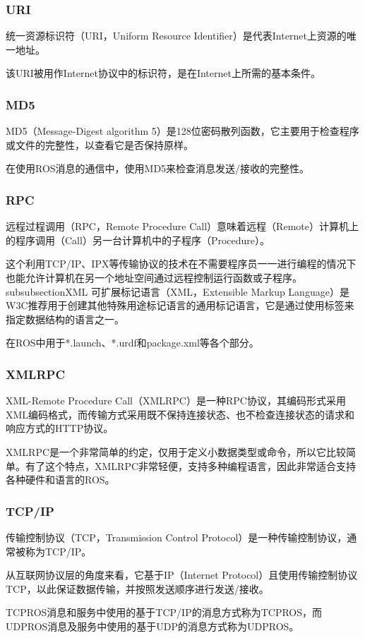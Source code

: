 \documentclass[geye,green,kindle,cn]{elegantnote}
\begin{document}
\subsubsection{URI}
统一资源标识符（URI，Uniform Resource Identifier）是代表Internet上资源的唯一地址。

该URI被用作Internet协议中的标识符，是在Internet上所需的基本条件。 
\subsubsection{MD5}
MD5（Message-Digest algorithm 5）是128位密码散列函数，它主要用于检查程序或文件的完整性，以查看它是否保持原样。

在使用ROS消息的通信中，使用MD5来检查消息发送/接收的完整性。
\subsubsection{RPC}
远程过程调用（RPC，Remote Procedure Call）意味着远程（Remote）计算机上的程序调用（Call）另一台计算机中的子程序（Procedure）。

这个利用TCP/IP、IPX等传输协议的技术在不需要程序员一一进行编程的情况下也能允许计算机在另一个地址空间通过远程控制运行函数或子程序。
subsubsection{XML}
可扩展标记语言（XML，Extensible Markup Language）是W3C推荐用于创建其他特殊用途标记语言的通用标记语言，它是通过使用标签来指定数据结构的语言之一。

在ROS中用于*.launch、*.urdf和package.xml等各个部分。
\subsubsection{XMLRPC}
XML-Remote Procedure Call（XMLRPC）是一种RPC协议，其编码形式采用XML编码格式，而传输方式采用既不保持连接状态、也不检查连接状态的请求和响应方式的HTTP协议。

XMLRPC是一个非常简单的约定，仅用于定义小数据类型或命令，所以它比较简单。有了这个特点，XMLRPC非常轻便，支持多种编程语言，因此非常适合支持各种硬件和语言的ROS。
\subsubsection{TCP/IP}
传输控制协议（TCP，Transmission Control Protocol）是一种传输控制协议，通常被称为TCP/IP。

从互联网协议层的角度来看，它基于IP（Internet Protocol）且使用传输控制协议TCP，以此保证数据传输，并按照发送顺序进行发送/接收。

TCPROS消息和服务中使用的基于TCP/IP的消息方式称为TCPROS，而UDPROS消息及服务中使用的基于UDP的消息方式称为UDPROS。
\end{document}
